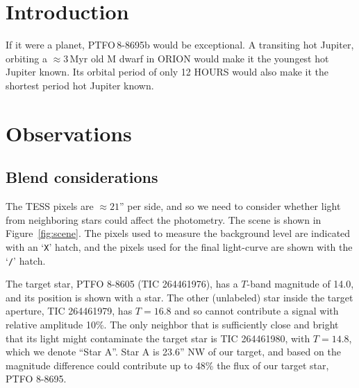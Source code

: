 \documentclass[12pt,twocolumn,tighten]{aastex62}
\begin{document}
\keywords{}


\section{Introduction}
If it were a planet, PTFO$\,$8-8695b would be exceptional.
A transiting hot Jupiter, orbiting a $\approx$3$\,$Myr old M dwarf
in ORION would make it the youngest hot Jupiter known.
Its orbital period of only 12 HOURS would also make it the shortest
period hot Jupiter known.


\section{Observations}
\label{sec:observations}

\subsection{Blend considerations}
\label{subsec:blend}

The TESS pixels are $\approx21$'' per side, and so we need to consider
whether light from neighboring stars could affect the photometry.  The
scene is shown in Figure~\ref{fig:scene}.  
The pixels used to
measure the background level are indicated with an `\texttt{X}' hatch,
and the pixels used for the final light-curve are shown with the
`\texttt{/}' hatch.

The target star, PTFO
8-8605 (TIC 264461976), has a $T$-band magnitude of 14.0, and its position is shown with a
star.  
The other (unlabeled) star inside the target aperture, TIC 264461979, has $T=16.8$ and so cannot
contribute a signal with relative amplitude 10\%.
The only neighbor that is sufficiently close and bright that
its light might contaminate the target star is TIC 264461980, with
$T=14.8$, which we denote ``Star A''.  Star A is 23.6'' NW of our
target, and based on the magnitude difference could contribute up to
48\% the flux of our target star, PTFO 8-8695.  
\end{document}

